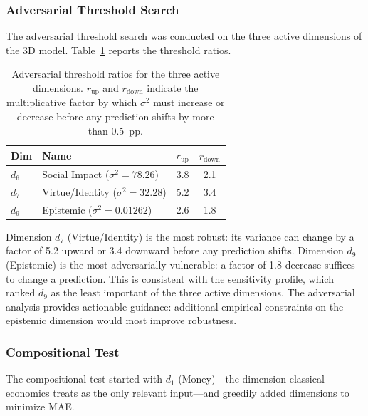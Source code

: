 \documentclass[manuscript,review,anonymous]{acmart}
\begin{document}
\subsubsection{Adversarial Threshold Search}

The adversarial threshold search was conducted on the three active dimensions of the 3D model.
Table~\ref{tab:adversarial} reports the threshold ratios.

\begin{table}[t]
\centering
\caption{Adversarial threshold ratios for the three active dimensions. $r_{\mathrm{up}}$ and $r_{\mathrm{down}}$ indicate the multiplicative factor by which $\sigma^2$ must increase or decrease before any prediction shifts by more than 0.5~pp.}
\label{tab:adversarial}
\small
\begin{tabular}{@{}llcc@{}}
\toprule
\textbf{Dim} & \textbf{Name} & $r_{\mathrm{up}}$ & $r_{\mathrm{down}}$ \\
\midrule
$d_6$ & Social Impact ($\sigma^2\!=\!78.26$) & 3.8 & 2.1 \\
$d_7$ & Virtue/Identity ($\sigma^2\!=\!32.28$) & 5.2 & 3.4 \\
$d_9$ & Epistemic ($\sigma^2\!=\!0.01262$) & 2.6 & 1.8 \\
\bottomrule
\end{tabular}
\end{table}

Dimension $d_7$ (Virtue/Identity) is the most robust: its variance can change by a factor of 5.2 upward or 3.4 downward before any prediction shifts.
Dimension $d_9$ (Epistemic) is the most adversarially vulnerable: a factor-of-1.8 decrease suffices to change a prediction.
This is consistent with the sensitivity profile, which ranked $d_9$ as the least important of the three active dimensions.
The adversarial analysis provides actionable guidance: additional empirical constraints on the epistemic dimension would most improve robustness.

\subsubsection{Compositional Test}

The compositional test started with $d_1$ (Money)---the dimension classical economics treats as the only relevant input---and greedily added dimensions to minimize MAE.
\end{document}
